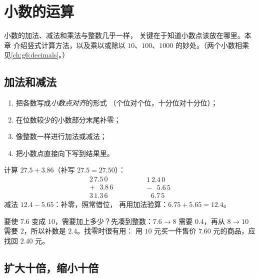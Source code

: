 \chapter{小数的运算}\label{ch:g5:decimalops}

小数的加法、减法和乘法与整数几乎一样，
关键在于知道小数点该放在哪里。本章
介绍竖式计算方法，以及乘以或除以
$10$、$100$、$1000$ 的妙处。（两个小数相乘
见\cref{ch:g6:decimals}。）

\section{加法和减法}

\begin{method}[小数点对齐的竖式]\label{met:g5:decimalops:addsub}
\begin{enumerate}
  \item 把各数写成\emph{小数点对齐}的形式
        （个位对个位，十分位对十分位）；
  \item 在位数较少的小数部分末尾补零；
  \item 像整数一样进行加法或减法；
  \item 把小数点直接向下写到结果里。
\end{enumerate}
\end{method}

\begin{example}\label{ex:g5:decimalops:addsub}
计算 $27.5 + 3.86$（补写 $27.5 = 27.50$）：
\[
\begin{array}{r}
2\,7.5\,0 \\
+\ \ \ 3.8\,6 \\
\hline
3\,1.3\,6
\end{array}
\qquad\qquad
\begin{array}{r}
1\,2.4\,0 \\
-\ \ \ 5.6\,5 \\
\hline
\ \ \,6.7\,5
\end{array}
\]
减法 $12.4 - 5.65$：补零，照常借位，
再用加法验算：$6.75 + 5.65 = 12.4$。
\end{example}

\begin{example}[求补数]\label{ex:g5:decimalops:complement}
要使 $7.6$ 变成 $10$，需要加上多少？先凑到整数：$7.6 \to 8$ 需要
$0.4$，再从 $8 \to 10$ 需要 $2$，所以补数是 $2.4$。找零时很有用：
用 $10$ 元买一件售价 $7.60$ 元的商品，应找回 $2.40$ 元。
\end{example}

\section{扩大十倍，缩小十倍}

